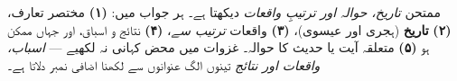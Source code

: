 \medskip
\begin{nukta}
ممتحن \emph{تاریخ، حوالہ اور ترتیبِ واقعات} دیکھتا ہے۔ ہر جواب میں:
\textbf{(۱)} مختصر تعارف، \textbf{(۲)} \textbf{تاریخ} (ہجری اور عیسوی)،
\textbf{(۳)} واقعات \emph{ترتیب سے}، \textbf{(۴)} نتائج و اسباق، اور جہاں
ممکن ہو \textbf{(۵)} متعلقہ آیت یا حدیث کا حوالہ۔ غزوات میں محض کہانی نہ
لکھیے --- \emph{اسباب، واقعات اور نتائج} تینوں الگ عنوانوں سے لکھنا اضافی
نمبر دلاتا ہے۔
\end{nukta}
